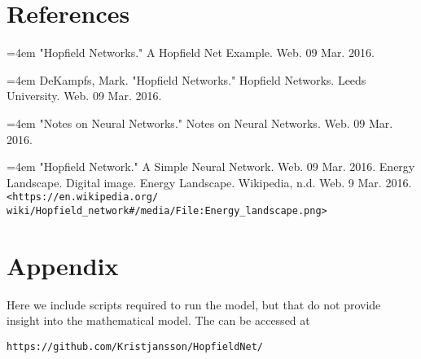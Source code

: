 \documentclass[]{article}
\theoremstyle{plain}
\theoremstyle{definition}
\begin{document}
\section{References}
\hfil

\hangindent=4em
"Hopfield Networks." A Hopfield Net Example. Web. 09 Mar. 2016.
 
\hangindent=4em
DeKampfs, Mark. "Hopfield Networks." Hopfield Networks. Leeds University. Web. 09 Mar. 2016.

\hangindent=4em
"Notes on Neural Networks." Notes on Neural Networks. Web. 09 Mar. 2016.

\hangindent=4em
"Hopfield Network." A Simple Neural Network. Web. 09 Mar. 2016.
Energy Landscape. Digital image. Energy Landscape. Wikipedia, n.d. Web. 9 Mar. 2016. 
\verb|<https://en.wikipedia.org/|
\verb|wiki/Hopfield_network#/media/File:Energy_landscape.png>|


\newpage

\section{Appendix}
Here we include scripts required to run the model, but that do not provide insight into the mathematical model. The can be accessed at \begin{verbatim}
https://github.com/Kristjansson/HopfieldNet/
\end{verbatim}
\end{document}
